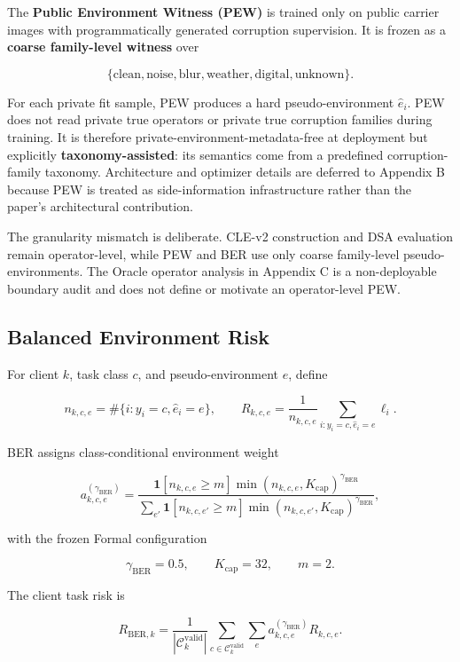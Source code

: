 The \textbf{Public Environment Witness (PEW)} is trained only on public carrier images with programmatically generated corruption supervision. It is frozen as a \textbf{coarse family-level witness} over

\[
\{\text{clean},\text{noise},\text{blur},\text{weather},\text{digital},\text{unknown}\}.
\]

For each private fit sample, PEW produces a hard pseudo-environment \(\hat e_i\). PEW does not read private true operators or private true corruption families during training. It is therefore private-environment-metadata-free at deployment but explicitly \textbf{taxonomy-assisted}: its semantics come from a predefined corruption-family taxonomy. Architecture and optimizer details are deferred to Appendix B because PEW is treated as side-information infrastructure rather than the paper's architectural contribution.

The granularity mismatch is deliberate. CLE-v2 construction and DSA evaluation remain operator-level, while PEW and BER use only coarse family-level pseudo-environments. The Oracle operator analysis in Appendix C is a non-deployable boundary audit and does not define or motivate an operator-level PEW.

\subsection{Balanced Environment Risk}

For client \(k\), task class \(c\), and pseudo-environment \(e\), define

\[
n_{k,c,e}=\#\{i:y_i=c,\hat e_i=e\},
\qquad
R_{k,c,e}=\frac1{n_{k,c,e}}\sum_{i:y_i=c,\hat e_i=e}\ell_i.
\]

BER assigns class-conditional environment weight

\[
a^{(\gamma_{\mathrm{BER}})}_{k,c,e}
=
\frac{
\mathbf 1[n_{k,c,e}\ge m]
\min(n_{k,c,e},K_{\mathrm{cap}})^{\gamma_{\mathrm{BER}}}
}{
\sum_{e'}
\mathbf 1[n_{k,c,e'}\ge m]
\min(n_{k,c,e'},K_{\mathrm{cap}})^{\gamma_{\mathrm{BER}}}
},
\]

with the frozen Formal configuration

\[
\gamma_{\mathrm{BER}}=0.5,\qquad K_{\mathrm{cap}}=32,\qquad m=2.
\]

The client task risk is

\[
R_{\mathrm{BER},k}
=
\frac1{|\mathcal C_k^{\mathrm{valid}}|}
\sum_{c\in\mathcal C_k^{\mathrm{valid}}}
\sum_e a^{(\gamma_{\mathrm{BER}})}_{k,c,e}R_{k,c,e}.
\]

